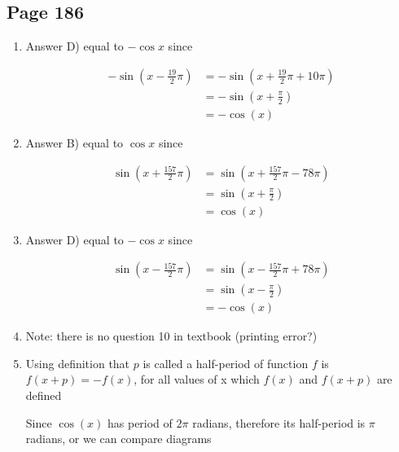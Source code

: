 \documentclass{article}
\newenvironment{solutions}[1]
{\subsection*{#1}
 \begin{enumerate}[leftmargin=1.5em]}
{\end{enumerate}}
\newcommand{\solution}{\item}
\begin{document}
\begin{solutions}{Page 186}
\solution
Answer D) equal to $-\cos x$ since

\begin{align*}
    -\sin \left(x-\frac{19}{2}\pi\right) &= -\sin \left(x+\frac{19}{2}\pi + 10\pi\right)\\
                       &= -\sin \left(x+\frac{\pi}{2}\right)\\
                      &= -\cos(x)
\end{align*}

\solution
Answer B) equal to $\cos x$ since

\begin{align*}
    \sin \left(x+\frac{157}{2}\pi\right) &= \sin \left(x+\frac{157}{2}\pi - 78\pi\right)\\
                       &= \sin \left(x+\frac{\pi}{2}\right)\\
                      &= \cos(x)
\end{align*}

\solution
Answer D) equal to $-\cos x$ since

\begin{align*}
    \sin \left(x-\frac{157}{2}\pi\right) &= \sin \left(x-\frac{157}{2}\pi + 78\pi\right)\\
                       &= \sin \left(x-\frac{\pi}{2}\right)\\
                      &= -\cos(x)
\end{align*}

\solution
Note: there is no question 10 in textbook (printing error?)

\solution %
Using definition that $p$ is called a half-period of function $f$ is $f(x+p)= -f(x)$, for all values of x which $f(x)$ and $f(x+p)$ are defined

Since $\cos (x) $ has period of $2\pi$ radians, therefore its half-period is $\pi$ radians, or we can compare diagrams



\end{solutions}
\end{document}
